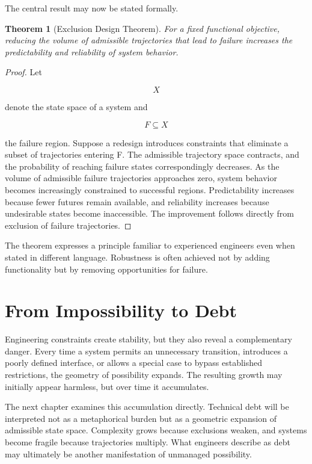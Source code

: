\documentclass[11pt,oneside]{book}
\theoremstyle{plain}
\newtheorem{theorem}{Theorem}[chapter]
\theoremstyle{definition}
\theoremstyle{remark}
\begin{document}
The central result may now be stated formally.

\begin{theorem}[Exclusion Design Theorem]
For a fixed functional objective, reducing the volume of admissible trajectories that lead to failure increases the predictability and reliability of system behavior.
\end{theorem}

\begin{proof}
Let

\begin{equation}
X
\end{equation}

denote the state space of a system and

\begin{equation}
F
\subseteq
X
\end{equation}

the failure region. Suppose a redesign introduces constraints that eliminate a subset of trajectories entering F. The admissible trajectory space contracts, and the probability of reaching failure states correspondingly decreases. As the volume of admissible failure trajectories approaches zero, system behavior becomes increasingly constrained to successful regions. Predictability increases because fewer futures remain available, and reliability increases because undesirable states become inaccessible. The improvement follows directly from exclusion of failure trajectories.
\end{proof}

The theorem expresses a principle familiar to experienced engineers even when stated in different language. Robustness is often achieved not by adding functionality but by removing opportunities for failure.

\section{From Impossibility to Debt}

Engineering constraints create stability, but they also reveal a complementary danger. Every time a system permits an unnecessary transition, introduces a poorly defined interface, or allows a special case to bypass established restrictions, the geometry of possibility expands. The resulting growth may initially appear harmless, but over time it accumulates.

The next chapter examines this accumulation directly. Technical debt will be interpreted not as a metaphorical burden but as a geometric expansion of admissible state space. Complexity grows because exclusions weaken, and systems become fragile because trajectories multiply. What engineers describe as debt may ultimately be another manifestation of unmanaged possibility.
\end{document}
